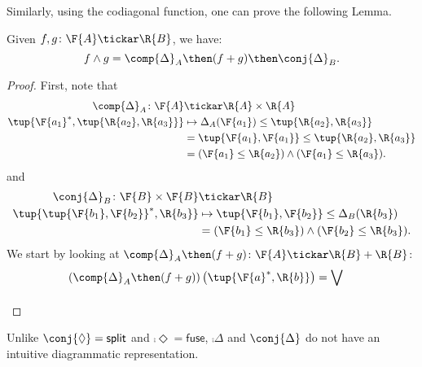 \noindent Similarly, using the codiagonal function, one can prove the following Lemma.
\begin{lemma}
    Given $f, g\colon \F{A} \tickar \R{B}$, we have:
    \begin{equation}
        f \wedge g = \comp{\Delta}_A \then(f + g) \then \conj{\Delta}_B.
    \end{equation}
\end{lemma}
\begin{proof}
First, note that
\begin{equation}
    \begin{aligned}
    \comp{\Delta}_A \colon \F{A}&\tickar \R{A}\times \R{A}\\
    \tup{\F{a_1}^*,\tup{\R{a_2},\R{a_3}}}&\mapsto \Delta_A(\F{a_1})\leq \tup{\R{a_2},\R{a_3}}\\
    &= \tup{\F{a_1},\F{a_1}}\leq \tup{\R{a_2},\R{a_3}}\\
    &= (\F{a_1}\leq \R{a_2}) \wedge (\F{a_1}\leq \R{a_3}).
    \end{aligned}
\end{equation}
and 
\begin{equation}
    \begin{aligned}
    \conj{\Delta}_B \colon \F{B}\times \F{B}&\tickar \R{B}\\
    \tup{\tup{\F{b_1},\F{b_2}}^*,\R{b_3}}&\mapsto \tup{\F{b_1},\F{b_2}}\leq \Delta_B(\R{b_3})\\
    &= (\F{b_1}\leq \R{b_3}) \wedge (\F{b_2}\leq \R{b_3}).
    \end{aligned}
\end{equation}
We start by looking at $\comp{\Delta}_A \then (f+g) \colon \F{A}\tickar \R{B}+\R{B}$:
\begin{equation}
    \begin{aligned}
    \left(\comp{\Delta}_A\then (f+g)\right)\left(\tup{\F{a}^*,\R{b}}\right)&=\bigvee_{}
    \end{aligned}
\end{equation}
\end{proof}
Unlike $\conj{\Diamond} = \mathsf{split}$ and $\comp{\Diamond} = \mathsf{fuse}$, $\comp{\Delta}$ and $\conj{\Delta}$ do not have an intuitive diagrammatic representation.